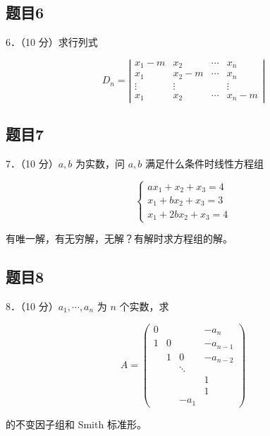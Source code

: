 \documentclass{article}
\begin{document}
\subsection{题目6}
6．（10 分）求行列式

\[
D_{n}=\left|\begin{array}{cccc}
x_{1}-m & x_{2} & \cdots & x_{n} \\
x_{1} & x_{2}-m & \cdots & x_{n} \\
\vdots & \vdots & & \vdots \\
x_{1} & x_{2} & \cdots & x_{n}-m
\end{array}\right|
\]

\subsection{题目7}
7．（10 分）\(a, b\) 为实数，问 \(a, b\) 满足什么条件时线性方程组

\[
\left\{\begin{array}{l}
a x_{1}+x_{2}+x_{3}=4 \\
x_{1}+b x_{2}+x_{3}=3 \\
x_{1}+2 b x_{2}+x_{3}=4
\end{array}\right.
\]

有唯一解，有无穷解，无解？有解时求方程组的解。

\subsection{题目8}
8．（10 分）\(a_{1}, \cdots, a_{n}\) 为 \(n\) 个实数，求

\[
A=\left(\begin{array}{cccc}
0 & & & -a_{n} \\
1 & 0 & & -a_{n-1} \\
& 1 & 0 & -a_{n-2} \\
& & \ddots & \\
& & & 1 \\
& & & 1 \\
& & -a_{1}
\end{array}\right)
\]

的不变因子组和 Smith 标准形。
\end{document}
